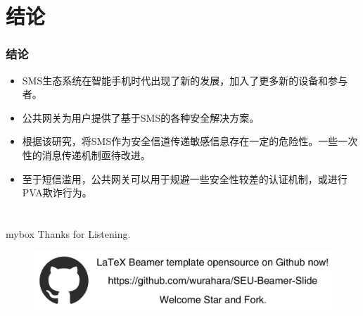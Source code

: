 \documentclass[10pt,aspectratio=43,mathserif]{beamer}
\begin{document}
\begin{frame}
\begin{columns}
            \end{columns}

		\end{frame}

\section[结论]{结论}


		\begin{frame}
		  \frametitle{\textbf{结论}}
		
		  \begin{itemize}
		    \item SMS生态系统在智能手机时代出现了新的发展，加入了更多新的设备和参与者。
		    \item 公共网关为用户提供了基于SMS的各种安全解决方案。
            \item 根据该研究，将SMS作为安全信道传递敏感信息存在一定的危险性。一些一次性的消息传递机制亟待改进。
            \item 至于短信滥用，公共网关可以用于规避一些安全性较差的认证机制，或进行PVA欺诈行为。
		  \end{itemize}
		\end{frame}


\section*{}
            \begin{frame}

                \begin{center}
                    \begin{minipage}{1\textwidth}
                        \begin{beamercolorbox}[wd=0.70\textwidth, rounded=true, shadow=true]{mybox}
                        \LARGE \centering Thanks for Listening.
                        \end{beamercolorbox}
                    \end{minipage}
                \end{center}

                \begin{figure}[!t]
                    \centering
                    \includegraphics[width=.8\textwidth]{figures/figure5.png}
                    \label{figure4_ad}
                \end{figure}
            \end{frame}
\end{document}

